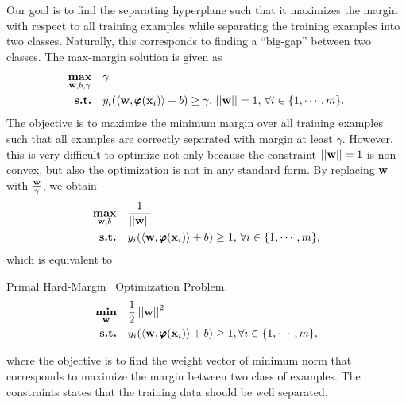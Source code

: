{Our goal is to find the separating hyperplane such that it maximizes the margin with respect to all training examples while separating the training examples into two classes.
Naturally, this corresponds to finding a ``big-gap'' between two classes.
The max-margin solution is given as \citep{Bishop07}
\begin{align*}
	\underset{\mathbf {w},b,\gamma}{\textbf{max}} &\quad \gamma\\
	\textbf{s.t.} &\quad y_i(\langle \mathbf {w}, \pmb \varphi(\mathbf {x}_i) \rangle+b) \ge \gamma, \, \left|\left| \mathbf {w} \right|\right|=1, \, \forall i\in\{1,\cdots,m\}.
\end{align*}
The objective is to maximize the minimum margin over all training examples such that all examples are correctly separated with margin at least $\gamma$.
However, this is very difficult to optimize not only because the constraint $\left|\left| \mathbf {w} \right|\right|=1$ is non-convex, but also the optimization is not in any standard form.
By replacing $\mathbf {w}$ with $\frac{\mathbf {w}}{\gamma}$, we obtain 
\begin{align*}
	\underset{\mathbf {w},b}{\textbf{max}} &\quad \frac{1}{\left|\left| \mathbf {w} \right|\right|}\\
	\textbf{s.t.} &\quad y_i(\langle \mathbf {w}, \pmb \varphi(\mathbf {x}_i) \rangle+b) \ge 1, \, \forall i\in\{1,\cdots,m\},
\end{align*}
which is equivalent to
\begin{definition}{Primal Hard-Margin \svm\ Optimization Problem.}\label{hardsvmprimal}
	\begin{align*}
		\underset{\mathbf {w}}{\textbf{min}} & \quad\frac{1}{2}\left|\left| \mathbf {w} \right|\right|^2\\
		\textbf{s.t.} & \quad y_i(\langle \mathbf {w}, \pmb \varphi(\mathbf {x}_i) \rangle + b) \ge 1, \forall i\in\{1,\cdots,m\},
	\end{align*}
\end{definition}
where the objective is to find the weight vector of minimum norm that corresponds to maximize the margin between two class of examples.
The constraints states that the training data should be well separated.

}
